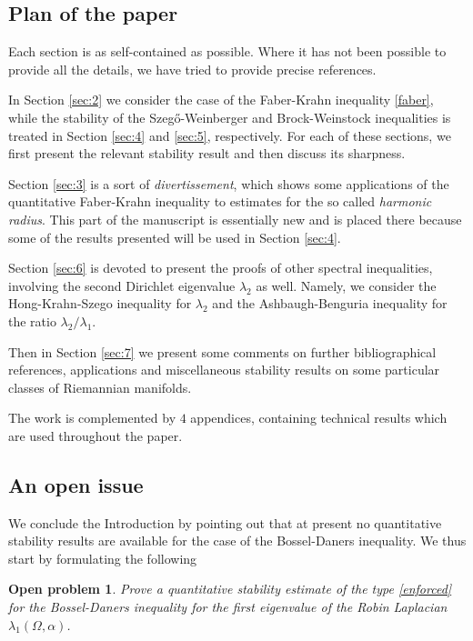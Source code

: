 \documentclass{amsart}
\newtheorem{openpb}{Open problem}
\theoremstyle{definition}
\numberwithin{equation}{section}
\begin{document}
\subsection{Plan of the paper} Each section is as self-contained as possible. Where it has not been possible to provide all the details, we have tried to provide precise references.
\par
In Section \ref{sec:2} we consider the case of the Faber-Krahn inequality \eqref{faber}, while the stability of the Szeg\H{o}-Weinberger and Brock-Weinstock inequalities is treated in Section \ref{sec:4} and \ref{sec:5}, respectively. For each of these sections, we first present the relevant stability result and then discuss its sharpness.
\par
Section \ref{sec:3} is a sort of {\it divertissement}, which shows some applications of the quantitative Faber-Krahn inequality to estimates for the so called {\it harmonic radius}. This part of the manuscript is essentially new and is placed there because some of the results presented will be used in Section \ref{sec:4}.
\par
Section \ref{sec:6} is devoted to present the proofs of other spectral inequalities, involving the second Dirichlet eigenvalue $\lambda_2$ as well. Namely, we consider the Hong-Krahn-Szego inequality for $\lambda_2$ and the Ashbaugh-Benguria inequality for the ratio $\lambda_2/\lambda_1$.
\par
Then in Section \ref{sec:7} we present some comments on further bibliographical references, applications and miscellaneous stability results on some particular classes of Riemannian manifolds.
\par
The work is complemented by $4$ appendices, containing technical results which are used throughout the paper.

\subsection{An open issue} We conclude the Introduction by pointing out that at present no quantitative stability results are available for the case of the Bossel-Daners inequality. We thus start by formulating the following
\begin{openpb}
Prove a quantitative stability estimate of the type \eqref{enforced} for the Bossel-Daners inequality for the first eigenvalue of the Robin Laplacian $\lambda_1(\Omega,\alpha)$.
\end{openpb}
\end{document}
